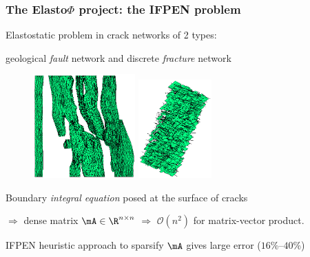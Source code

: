 \begin{frame}
\frametitle{The Elasto$\Phi$ project: the IFPEN problem} 

Elastostatic problem in \alert{crack networks} of 2 types: 

geological \emph{fault} network and discrete \emph{fracture} network 

\vspace{-5pt}

\begin{figure}
\centering
\includegraphics[width=0.35\textwidth]{../images/visu_maillage5364FracsTriangles.png} \quad
\includegraphics[width=0.25\textwidth]{../images/visu_maillage1994Fracs.png}
\end{figure}

Boundary \emph{integral equation} posed at the surface of cracks

$\Rightarrow$ \alert{dense matrix} $\mA\in \R^{n\times n}$
$\Rightarrow$ $\mathcal{O}(n^{2})$ for matrix-vector product.

\medskip
IFPEN heuristic approach to sparsify $\mA$ gives large error ($16$\%--$40$\%)

\end{frame}


